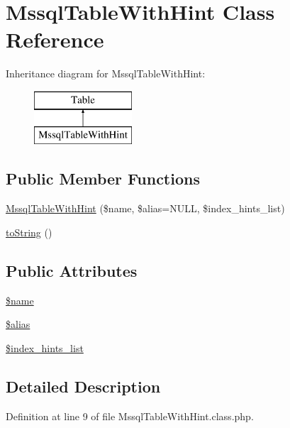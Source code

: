 \hypertarget{classMssqlTableWithHint}{}\section{Mssql\+Table\+With\+Hint Class Reference}
\label{classMssqlTableWithHint}
Inheritance diagram for Mssql\+Table\+With\+Hint\+:\begin{figure}[H]
\begin{center}
\leavevmode
\includegraphics[height=2.000000cm]{classMssqlTableWithHint}
\end{center}
\end{figure}
\subsection*{Public Member Functions}
\begin{DoxyCompactItemize}
\item 
\hyperlink{classMssqlTableWithHint_a7d6526d0b856c8a5afe4b630b27ddbe4}{Mssql\+Table\+With\+Hint} (\$name, \$alias=N\+U\+L\+L, \$index\+\_\+hints\+\_\+list)
\item 
\hyperlink{classMssqlTableWithHint_ac73aaae941e5dd3f4c22d7c718a317f8}{to\+String} ()
\end{DoxyCompactItemize}
\subsection*{Public Attributes}
\begin{DoxyCompactItemize}
\item 
\hyperlink{classMssqlTableWithHint_a277ff00978ac421ee07783d796318bf5}{\$name}
\item 
\hyperlink{classMssqlTableWithHint_abe5643a9f48a397be1d66f7aba2fd7d9}{\$alias}
\item 
\hyperlink{classMssqlTableWithHint_af748588ba4420eb31c412a83b1623a60}{\$index\+\_\+hints\+\_\+list}
\end{DoxyCompactItemize}


\subsection{Detailed Description}


Definition at line 9 of file Mssql\+Table\+With\+Hint.\+class.\+php.



